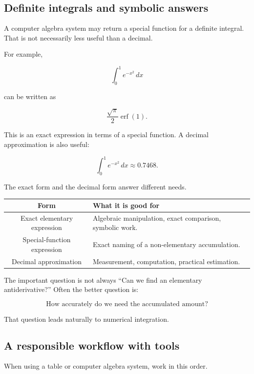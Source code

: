 \subsection{Definite integrals and symbolic answers}
\label{subsec:definite-integrals-symbolic-answers}

A computer algebra system may return a special function for a definite integral.  That is
not necessarily less useful than a decimal.

For example,

\[
\int_0^1 e^{-x^2}\,dx
\]

can be written as

\[
\frac{\sqrt{\pi}}{2}\operatorname{erf}(1).
\]

This is an exact expression in terms of a special function.  A decimal approximation is
also useful:

\[
\int_0^1 e^{-x^2}\,dx\approx0.7468.
\]

The exact form and the decimal form answer different needs.

\begin{center}
\begin{tabular}{c|p{}}
\textbf{Form} & \textbf{What it is good for} \\ \hline
Exact elementary expression & Algebraic manipulation, exact comparison, symbolic work. \\[4pt]
Special-function expression & Exact naming of a non-elementary accumulation. \\[4pt]
Decimal approximation & Measurement, computation, practical estimation.
\end{tabular}
\end{center}

The important question is not always ``Can we find an elementary antiderivative?''  Often
the better question is:

\[
\text{How accurately do we need the accumulated amount?}
\]

That question leads naturally to numerical integration.

\subsection{A responsible workflow with tools}
\label{subsec:responsible-workflow-tools}

When using a table or computer algebra system, work in this order.

